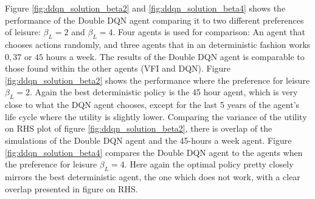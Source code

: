 Figure \ref{fig:ddqn_solution_beta2} and \ref{fig:ddqn_solution_beta4} shows the performance of the Double DQN agent comparing it to two different preferences of leisure: $\beta_L = 2$ and $\beta_L = 4$. Four agents is used for comparison: An agent that chooses actions randomly, and three agents that in an deterministic fashion works $0, 37$ or $45$ hours a week. The results of the Double DQN agent is comparable to those found within the other agents (VFI and DQN). Figure \ref{fig:ddqn_solution_beta2} shows the performance where the preference for leisure $\beta_L = 2$. Again the best deterministic policy is the 45 hour agent, which is very close to what the DQN agent chooses, except for the last 5 years of the agent's life cycle where the utility is slightly lower. Comparing the variance of the utility on RHS plot of figure \ref{fig:ddqn_solution_beta2}, there is overlap of the simulations of the Double DQN agent and the 45-hours a week agent. Figure \ref{fig:ddqn_solution_beta4} compares the Double DQN agent to the agents when the preference for leisure $\beta_L = 4$. Here again the optimal policy pretty closely mirrors the best deterministic agent, the one which does not work, with a clear overlap presented in figure on RHS.
